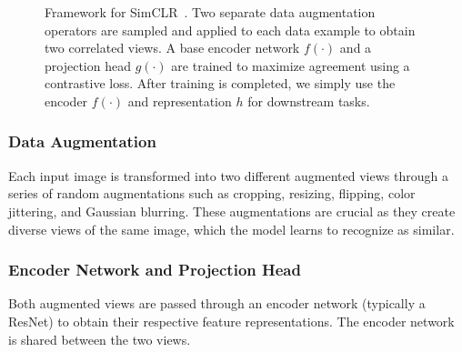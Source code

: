 \documentclass{article}
\begin{document}
\begin{figure}[!t]
  \small
  \centering
  \caption{Framework for SimCLR~\cite{simclr}.
    Two separate data augmentation operators are sampled and applied to each data example to obtain two correlated views.
    A base encoder network $f(\cdot)$ and a projection head $g(\cdot)$ are trained to maximize agreement using a contrastive loss.
    After training is completed, we simply use the encoder $f(\cdot)$ and representation $ h$ for downstream tasks.}\label{fig:framework}
\end{figure}

\subsubsection{Data Augmentation}
Each input image is transformed into two different augmented views through a
series of random augmentations such as cropping, resizing, flipping, color
jittering, and Gaussian blurring. These augmentations are crucial as they
create diverse views of the same image, which the model learns to recognize as
similar.

\subsubsection{Encoder Network and Projection Head}
Both augmented views are passed through an encoder network (typically a ResNet)
to obtain their respective feature representations. The encoder network is
shared between the two views.
\end{document}
